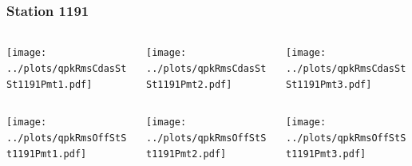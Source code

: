 \documentclass[aspectratio=169]{beamer}
\begin{document}
\begin{frame} 
  \frametitle{Station 1191}
  \begin{center}
    \begin{columns}
      \begin{column}{0.33\textwidth}
        \texttt{[image: ../plots/qpkRmsCdasStSt1191Pmt1.pdf]}
      \end{column}
      \begin{column}{0.33\textwidth}
        \texttt{[image: ../plots/qpkRmsCdasStSt1191Pmt2.pdf]}
      \end{column}
      \begin{column}{0.33\textwidth}
        \texttt{[image: ../plots/qpkRmsCdasStSt1191Pmt3.pdf]}
      \end{column}
    \end{columns}
  \end{center}

  \begin{center}
    \begin{columns}
      \begin{column}{0.33\textwidth}
        \texttt{[image: ../plots/qpkRmsOffStSt1191Pmt1.pdf]}
      \end{column}
      \begin{column}{0.33\textwidth}
        \texttt{[image: ../plots/qpkRmsOffStSt1191Pmt2.pdf]}
      \end{column}
      \begin{column}{0.33\textwidth}
        \texttt{[image: ../plots/qpkRmsOffStSt1191Pmt3.pdf]}
      \end{column}
    \end{columns}
  \end{center}
\end{frame}
\end{document}
